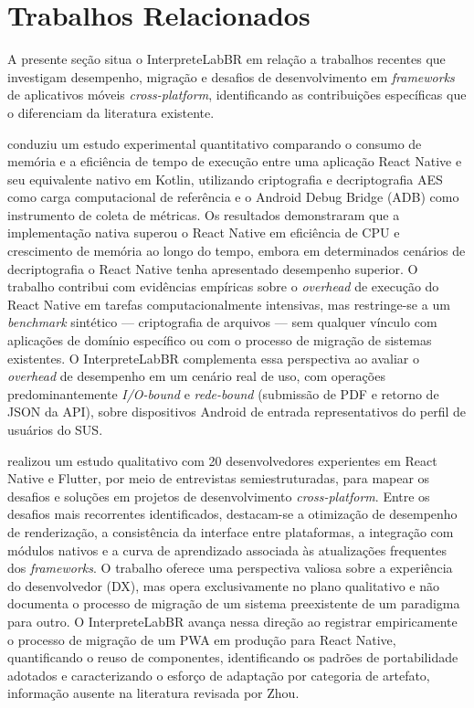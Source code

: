 \documentclass[12pt]{article}
\begin{document}
\section{Trabalhos Relacionados}

A presente seção situa o InterpreteLabBR em relação a trabalhos recentes
que investigam desempenho, migração e desafios de desenvolvimento em
\textit{frameworks} de aplicativos móveis \textit{cross-platform},
identificando as contribuições específicas que o diferenciam da literatura
existente.

\cite{sokolov2025} conduziu um estudo experimental quantitativo comparando
o consumo de memória e a eficiência de tempo de execução entre uma aplicação
React Native e seu equivalente nativo em Kotlin, utilizando criptografia e
decriptografia AES como carga computacional de referência e o Android Debug
Bridge (ADB) como instrumento de coleta de métricas. Os resultados
demonstraram que a implementação nativa superou o React Native em eficiência
de CPU e crescimento de memória ao longo do tempo, embora em determinados
cenários de decriptografia o React Native tenha apresentado desempenho
superior. O trabalho contribui com evidências empíricas sobre o
\textit{overhead} de execução do React Native em tarefas computacionalmente
intensivas, mas restringe-se a um \textit{benchmark} sintético — criptografia
de arquivos — sem qualquer vínculo com aplicações de domínio específico ou
com o processo de migração de sistemas existentes. O InterpreteLabBR
complementa essa perspectiva ao avaliar o \textit{overhead} de desempenho
em um cenário real de uso, com operações predominantemente
\textit{I/O-bound} e \textit{rede-bound} (submissão de PDF e retorno de
JSON da API), sobre dispositivos Android de entrada representativos do
perfil de usuários do SUS.

\cite{zhou2024} realizou um estudo qualitativo com 20 desenvolvedores
experientes em React Native e Flutter, por meio de entrevistas
semiestruturadas, para mapear os desafios e soluções em projetos de
desenvolvimento \textit{cross-platform}. Entre os desafios mais recorrentes
identificados, destacam-se a otimização de desempenho de renderização, a
consistência da interface entre plataformas, a integração com módulos
nativos e a curva de aprendizado associada às atualizações frequentes dos
\textit{frameworks}. O trabalho oferece uma perspectiva valiosa sobre a
experiência do desenvolvedor (DX), mas opera exclusivamente no plano
qualitativo e não documenta o processo de migração de um sistema
preexistente de um paradigma para outro. O InterpreteLabBR avança nessa
direção ao registrar empiricamente o processo de migração de um PWA em
produção para React Native, quantificando o reuso de componentes,
identificando os padrões de portabilidade adotados e caracterizando o
esforço de adaptação por categoria de artefato, informação ausente na
literatura revisada por Zhou.
\end{document}
